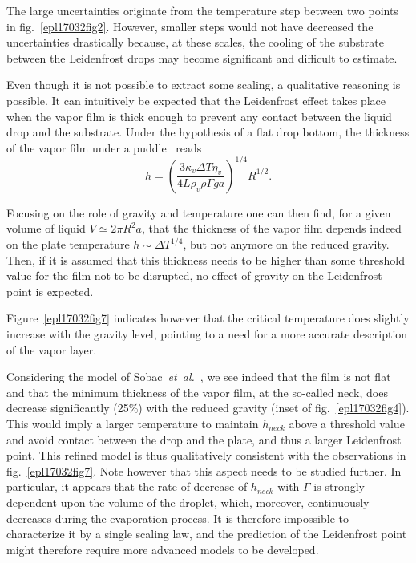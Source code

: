 \documentclass[doublecol,final]{epl2}
\begin{document}
The large uncertainties originate from the temperature step between two points in fig.~\ref{epl17032fig2}. However, smaller steps would not have decreased the uncertainties drastically because, at these scales, the cooling of the substrate between the Leidenfrost drops may become significant and difficult to estimate.

Even though it is not possible to extract some scaling, a qualitative reasoning is possible. It can intuitively be expected that the Leidenfrost effect takes place when the vapor film is thick enough to prevent any contact between the liquid drop and the substrate. Under the hypothesis of a flat drop bottom, the thickness of the vapor film under a puddle~\cite{epl17032bib3} reads
\begin{equation}%
h=\left(\frac{3\kappa_v\Delta T\eta_v}{4L\rho_v\rho\Gamma ga}\right)^{1/4}R^{1/2}.
\label{epl17032eqn5}
\end{equation}

Focusing on the role of gravity and temperature one can then find, for a given volume of liquid $V \simeq2\pi R^2a$, that the thickness of the vapor film depends indeed on the plate temperature $h\sim\Delta T^{1/4} $, but not anymore on the reduced gravity. Then, if it is assumed that this thickness needs to be higher than some threshold value for the film not to be disrupted, no effect of gravity on the Leidenfrost point is expected.

Figure~\ref{epl17032fig7} indicates however that the critical temperature does slightly increase with the gravity level, pointing to a need for a more accurate description of the vapor layer.

Considering the model of Sobac~\textit{et~al.}~\cite{epl17032bib8}, we see indeed that the film is not flat and that the {minimum} thickness of the vapor film, at the so-called neck, does decrease significantly (25{\%}) with the reduced gravity (inset of fig.~\ref{epl17032fig4}). This would imply a larger temperature to maintain $h_{\textit{neck}}$ above a threshold value and avoid contact between the drop and the plate, and thus a larger Leidenfrost point. This refined model is thus qualitatively consistent with the observations in fig.~\ref{epl17032fig7}. Note however that this aspect needs to be studied further. In particular, it appears that the rate of decrease of $h_{\textit{neck}}$ with $\Gamma$ is strongly dependent upon the volume of the droplet, which, moreover, continuously decreases during the evaporation process. It is therefore impossible to characterize it by a single scaling law, and the prediction of the Leidenfrost point might therefore require more advanced models to be developed.
\end{document}
